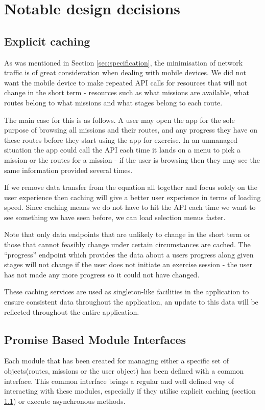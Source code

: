 \section{Notable design decisions}\label{sec:notable}
\subsection{Explicit caching}
\label{sec:explicit_caching}
As was mentioned in Section \ref{sec:specification}, the minimisation of network
traffic is of great consideration when dealing with mobile devices. We
did not want the mobile device to make repeated API calls for
resources that will not change in the short term - resources such as
what missions are available, what routes belong to what missions and
what stages belong to each route. 

The main case for this is as follows. A user may open the app for the
sole purpose of browsing all missions and their routes, and any
progress they have on these routes before they start using the app for
exercise. In an unmanaged situation the app could call the API each
time it lands on a menu to pick a mission or the routes for a mission
- if the user is browsing then they may see the same information
provided several times. 

If we remove data transfer from the equation all together and focus
solely on the user experience then caching will give a better user
experience in terms of loading speed. Since caching means we do not
have to hit the API each time we want to see something we have seen
before, we can load selection menus faster. 

Note that only data endpoints that are unlikely to change in the short
term or those that cannot feasibly change under certain circumstances
are cached. The ``progress'' endpoint which provides the data about a
users progress along given stages will not change if the user does not
initiate an exercise session - the user has not made any more progress
so it could not have changed.

These caching services are used as singleton-like facilities in the
application to ensure consistent data throughout the application, an
update to this data will be reflected throughout the entire
application. 

\subsection{Promise Based Module Interfaces}
Each module that has been created for managing either a specific set
of objects(routes, missions or the user object) has been defined
with a common interface. This common interface brings a regular
and well defined way of interacting with these modules, especially if
they utilise explicit caching (section \ref{sec:explicit_caching}) or
execute asynchronous methods.

